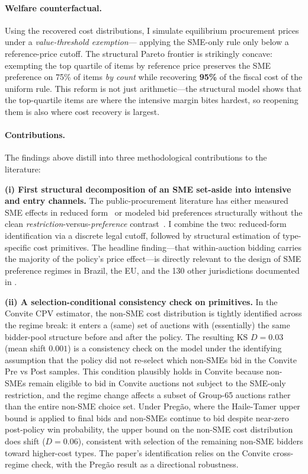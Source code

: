 \documentclass[12pt]{article}
\begin{document}
\paragraph{Welfare counterfactual.}
Using the recovered cost distributions, I simulate equilibrium
procurement prices under a \emph{value-threshold exemption}---
applying the SME-only rule only below a reference-price cutoff.
The structural Pareto frontier is strikingly concave: exempting
the top quartile of items by reference price preserves the SME
preference on 75\% of items \emph{by count} while recovering
\textbf{95\%} of the fiscal cost of the uniform rule. This reform
is not just arithmetic---the structural model shows that the
top-quartile items are where the intensive margin bites hardest,
so reopening them is also where cost recovery is largest.

\paragraph{Contributions.}
The findings above distill into three methodological contributions
to the literature:

\noindent\textbf{(i) First structural decomposition of an SME
set-aside into intensive and entry channels.} The public-procurement
literature has either measured SME effects in reduced
form~\citep{marion2007, denes1997, ferraz2015} or modeled bid
preferences structurally without the clean
\emph{restriction}-versus-\emph{preference}
contrast~\citep{krasnokutskayaseim2011, athey2013}. I combine the
two: reduced-form identification via a discrete legal cutoff,
followed by structural estimation of type-specific cost primitives.
The headline finding---that within-auction bidding carries the
majority of the policy's price effect---is directly relevant to
the design of SME preference regimes in Brazil, the EU, and the
130 other jurisdictions documented in \citet{oecd2018, sigma2016,
hoekman2020}.

\noindent\textbf{(ii) A selection-conditional consistency check on
primitives.} In the Convite CPV estimator, the non-SME cost
distribution is tightly identified across the regime break: it
enters a (same) set of auctions with (essentially) the same
bidder-pool structure before and after the policy. The resulting
KS $D = 0.03$ (mean shift $0.001$) is a consistency check on the
model under the identifying assumption that the policy did not
re-select which non-SMEs bid in the Convite Pre vs Post samples.
This condition plausibly holds in Convite because non-SMEs remain
eligible to bid in Convite auctions not subject to the SME-only
restriction, and the regime change affects a subset of Group-65
auctions rather than the entire non-SME choice set. Under Preg\~ao,
where the Haile-Tamer upper bound is applied to final bids and
non-SMEs continue to bid despite near-zero post-policy win
probability, the upper bound on the non-SME cost distribution does
shift ($D = 0.06$), consistent with selection of the remaining
non-SME bidders toward higher-cost types. The paper's
identification relies on the Convite cross-regime check, with the
Preg\~ao result as a directional robustness.
\end{document}

